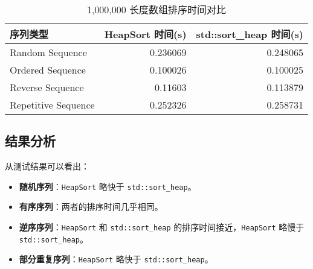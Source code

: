 \documentclass[UTF8, 12pt]{ctexart}
\begin{document}
\begin{table}[H]
  \centering
  \begin{tabular}{|l|r|r|}
    \hline
    序列类型             & HeapSort 时间(s) & std::sort\_heap 时间(s) \\ \hline
    Random Sequence      & 0.236069          & 0.248065                \\ \hline
    Ordered Sequence     & 0.100026          & 0.100025                \\ \hline
    Reverse Sequence     & 0.11603           & 0.113879                \\ \hline
    Repetitive Sequence  & 0.252326          & 0.258731                \\ \hline
  \end{tabular}
  \caption{1,000,000 长度数组排序时间对比}
\end{table}

\subsection{结果分析}
从测试结果可以看出：
\begin{itemize}
    \item \textbf{随机序列}：\verb|HeapSort| 略快于 \verb|std::sort_heap|。
    \item \textbf{有序序列}：两者的排序时间几乎相同。
    \item \textbf{逆序序列}：\verb|HeapSort| 和 \verb|std::sort_heap| 的排序时间接近，\verb|HeapSort| 略慢于 \verb|std::sort_heap|。
    \item \textbf{部分重复序列}：\verb|HeapSort| 略快于 \verb|std::sort_heap|。
\end{itemize}
\end{document}
